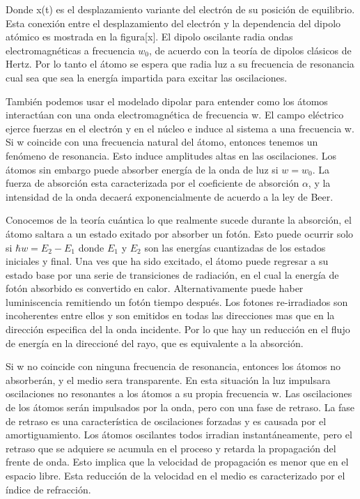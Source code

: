 \documentclass[a4paper,openright,12pt]{book}
\begin{document}
Donde x(t) es el desplazamiento variante del electrón de su posición de equilibrio. Esta conexión entre el desplazamiento del electrón y la dependencia del dipolo atómico es mostrada en la figura[x]. El dipolo oscilante radia ondas electromagnéticas a frecuencia $w_{0}$, de acuerdo con la teoría de dipolos clásicos de Hertz. Por lo tanto el átomo se espera que radia luz a su frecuencia de resonancia cual sea que sea la energía impartida para excitar las oscilaciones.

También podemos usar el modelado dipolar para entender como los átomos interactúan con una onda electromagnética  de frecuencia w. El campo eléctrico ejerce fuerzas en el electrón y en el núcleo e induce al sistema a una frecuencia w. Si w coincide con una frecuencia natural del átomo, entonces tenemos un fenómeno de resonancia. Esto induce amplitudes altas en las oscilaciones. Los átomos sin embargo puede absorber energía de la onda de luz si $w=w_{0}$. La fuerza de absorción esta caracterizada por el coeficiente de absorción $\alpha$, y la intensidad de la onda decaerá exponencialmente de acuerdo a la ley de Beer.

Conocemos de la teoría cuántica lo que realmente sucede durante la absorción, el átomo saltara a un estado exitado por absorber un fotón. Esto puede ocurrir solo si $\hbar w=E_{2}-E_{1}$ donde $E_{1}$ y $E_{2}$ son las energías cuantizadas de los estados iniciales y final. Una ves que ha sido excitado, el átomo puede regresar a su estado base por una serie de transiciones de radiación, en el cual la energía de fotón absorbido es convertido en calor. Alternativamente puede haber luminiscencia remitiendo un fotón tiempo después. Los fotones re-irradiados son incoherentes entre ellos y son emitidos en todas las direcciones mas que en la dirección especifica del la onda incidente.  Por lo que hay un reducción en el flujo de energía en la direccioné del rayo, que es equivalente a la absorción.

Si w no coincide con ninguna frecuencia de resonancia, entonces los átomos no absorberán, y el medio sera transparente. En esta situación la luz  impulsara oscilaciones no resonantes a los átomos a su propia frecuencia w. Las oscilaciones de los átomos serán impulsados por la onda, pero con una fase de retraso. La fase de retraso es una característica de oscilaciones forzadas y es causada por el amortiguamiento. Los átomos oscilantes todos irradian instantáneamente, pero el retraso que se adquiere se acumula en el proceso y retarda la propagación del frente de onda. Esto implica que la velocidad de propagación es menor que en el espacio libre. Esta reducción de la velocidad en el medio es caracterizado por el índice de refracción.
\end{document}
